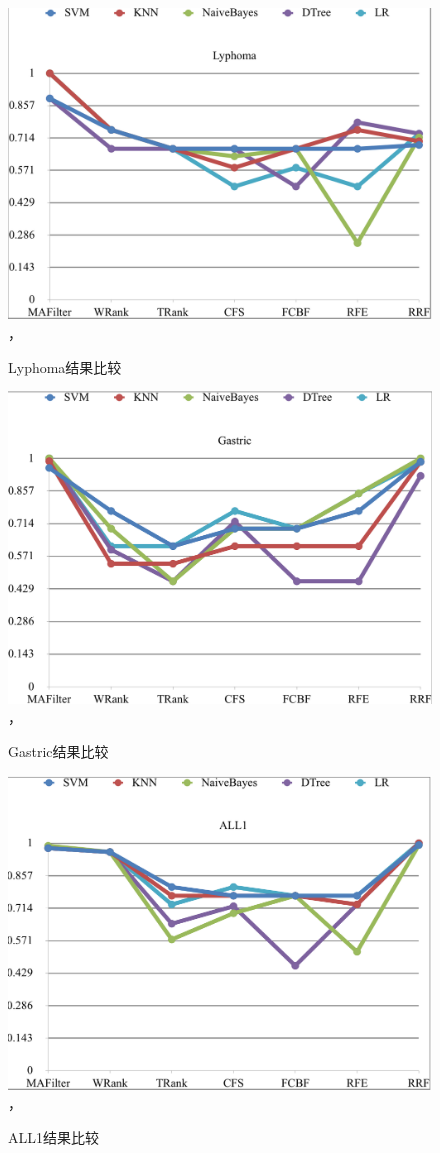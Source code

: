 \begin{figure}[!ht]
    \centering
    \includegraphics[width=5in]{pic/fig7}， 
    \caption{Lyphoma结果比较}
\end{figure}

\begin{figure}[!ht]
    \centering
    \includegraphics[width=5in]{pic/fig8}， 
    \caption{Gastric结果比较}
\end{figure}

\begin{figure}[!ht]
    \centering
    \includegraphics[width=5in]{pic/fig9}， 
    \caption{ALL1结果比较}
\end{figure}

